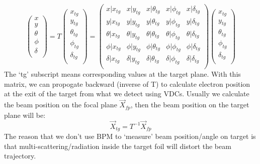 \begin{equation}
    \begin{pmatrix}
	x   \\
	y   \\
	\theta	\\
	\phi	\\
	\delta	\\
    \end{pmatrix}
    =
    T
    \begin{pmatrix}
	x_{tg}   \\
	y_{tg}   \\
	\theta_{tg}	\\
	\phi_{tg}	\\
	\delta_{tg}	\\
    \end{pmatrix}
    =
    \begin{pmatrix}
	x|x_{tg} & x|y_{tg}   & x|\theta_{tg}	& x|\phi_{tg}    & x|\delta_{tg}    \\
	y|x_{tg} & y|y_{tg}   & y|\theta_{tg}	& y|\phi_{tg}    & y|\delta_{tg}    \\
	\theta|x_{tg} & \theta|y_{tg}   & \theta|\theta_{tg}	& \theta|\phi_{tg}    & \theta|\delta_{tg}    \\
	\phi|x_{tg} & \phi|y_{tg}   & \phi|\theta_{tg}	& \phi|\phi_{tg}    & \phi|\delta_{tg}    \\
	\delta|x_{tg} & \delta|y_{tg}   & \delta|\theta_{tg}	& \delta|\phi_{tg}    & \delta|\delta_{tg}    \\
    \end{pmatrix}
    \begin{pmatrix}
	x_{tg}   \\
	y_{tg}   \\
	\theta_{tg}	\\
	\phi_{tg}	\\
	\delta_{tg}	\\
    \end{pmatrix}
\end{equation}
The `tg' subscript means corresponding values at the target plane. With this matrix, we can
propogate backward (inverse of T) to calculate electron position at the exit 
of the target from what we detect using VDCs. Usually we calculate the beam
position on the focal plane $\vec{X}_{fp}$, then the beam position on the target
plane will be: 
\begin{equation}
    \vec{X}_{tg} = T^{-1} \vec{X}_{fp}
    \label{eq:reconstruction}
\end{equation}
The reason that we don't use BPM to `measure' beam position/angle on target is that 
multi-scattering/radiation inside the target foil will distort the beam trajectory. 

